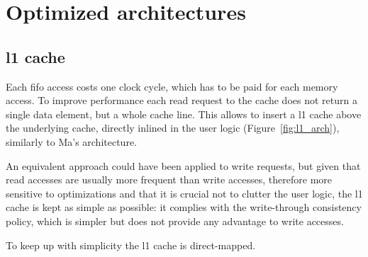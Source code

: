 \documentclass[11pt,a4paper,oneside]{memoir}
\begin{document}

\chapter{Optimized architectures}
\section{\ac{l1} cache}
Each \ac{fifo} access costs one clock cycle, which has to be paid for each
memory access.
To improve performance each read request to the cache does not return a single
data element, but a whole cache line. This allows to insert a \ac{l1} cache
above the underlying cache, directly inlined in the user logic
(Figure~\ref{fig:l1_arch}), similarly to Ma's architecture.

An equivalent approach could have been applied to write requests, but given that
read accesses are usually more frequent than write accesses, therefore more
sensitive to optimizations and that it is crucial not to clutter the user
logic, the \ac{l1} cache is kept as simple as possible: it complies with the
write-through consistency policy, which is simpler but does not provide any
advantage to write accesses.

To keep up with simplicity the \ac{l1} cache is direct-mapped.
\end{document}
